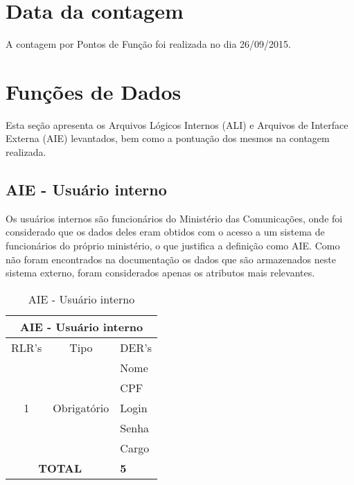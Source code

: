 \section{Data da contagem}

  A contagem por Pontos de Função foi realizada no dia 26/09/2015.

\section{Funções de Dados}

Esta seção apresenta os Arquivos Lógicos Internos (ALI) e Arquivos de Interface Externa (AIE) levantados, bem como a 
pontuação dos mesmos na contagem realizada.
     
  \subsection{AIE - Usuário interno}
      
      Os usuários internos são funcionários do Ministério das Comunicações, onde foi considerado que os dados deles
      eram obtidos com o acesso a um sistema de funcionários do próprio ministério, o que justifica a definição como AIE.
      Como não foram encontrados na documentação os dados que são armazenados neste sistema externo,
      foram considerados apenas os atributos mais relevantes.
      
      \begin{table}[!h]
      \centering
      \caption{AIE - Usuário interno}
      \label{aie_usuario_interno}
      \begin{tabular}{|c|c|l|}
      \hline
      \multicolumn{3}{|c|}{AIE - Usuário interno}                                             \\ \hline
      \multicolumn{1}{|l|}{RLR's} & Tipo                         & \multicolumn{1}{c|}{DER's} \\ \hline
      \multirow{5}{*}{1}          & \multirow{5}{*}{Obrigatório} & Nome                       \\ \cline{3-3} 
				  &                              & CPF                        \\ \cline{3-3} 
				  &                              & Login                      \\ \cline{3-3} 
				  &                              & Senha                      \\ \cline{3-3}
                                  &		                 & Cargo                      \\ \hline
                                  
      \multicolumn{2}{|c|}{\textbf{TOTAL}} & \textbf{5} \\ \hline
      \end{tabular}
      \end{table}
      
